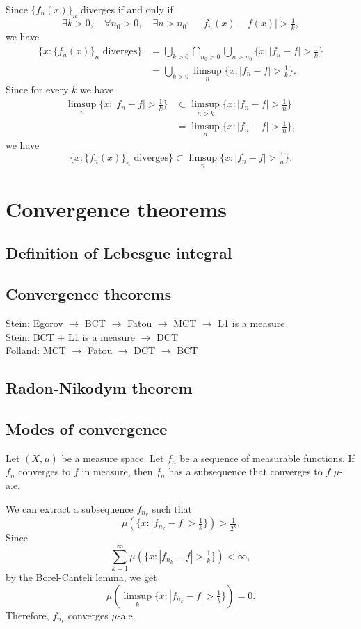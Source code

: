 \documentclass{../note}
\begin{document}
Since $\{f_n(x)\}_n$ diverges if and only if
\[\exists k>0,\quad\forall n_0>0,\quad\exists n>n_0:\quad|f_n(x)-f(x)|>\tfrac1k,\]
we have
\begin{align*}
\{x:\{f_n(x)\}_n\text{ diverges}\}
&=\bigcup_{k>0}\bigcap_{n_0>0}\bigcup_{n>n_0}\{x:|f_n-f|>\tfrac1k\}\\
&=\bigcup_{k>0}\limsup_n\{x:|f_n-f|>\tfrac1k\}.
\end{align*}
Since for every $k$ we have
\begin{align*}
\limsup_n\{x:|f_n-f|>\tfrac1k\}
&\subset\limsup_{n>k}\{x:|f_n-f|>\tfrac1n\}\\
&=\limsup_n\{x:|f_n-f|>\tfrac1n\},
\end{align*}
we have
\[\{x:\{f_n(x)\}_n\text{ diverges}\}\subset\limsup_n\{x:|f_n-f|>\tfrac1n\}.\]











\chapter{Convergence theorems}
\section{Definition of Lebesgue integral}
\section{Convergence theorems}

Stein: Egorov $\to$ BCT $\to$ Fatou $\to$ MCT $\to$ L1 is a measure\\
Stein: BCT + L1 is a measure $\to$ DCT\\
Folland: MCT $\to$ Fatou $\to$ DCT $\to$ BCT





\section{Radon-Nikodym theorem}


\section{Modes of convergence}

\begin{prb}
Let $(X,\mu)$ be a measure space.
Let $f_n$ be a sequence of measurable functions.
If $f_n$ converges to $f$ in measure, then $f_n$ has a subsequence that converges to $f$ $\mu$-a.e.
\end{prb}
\begin{pf}
We can extract a subsequence $f_{n_k}$ such that
\[\mu(\{x:|f_{n_k}-f|>\tfrac1k\})>\tfrac1{2^k}.\]
Since
\[\sum_{k=1}^\infty\mu(\{x:|f_{n_k}-f|>\tfrac1k\})<\infty,\]
by the Borel-Canteli lemma, we get
\[\mu(\limsup_k\{x:|f_{n_k}-f|>\tfrac1k\})=0.\]
Therefore, $f_{n_k}$ converges $\mu$-a.e.
\end{pf}
\end{document}
